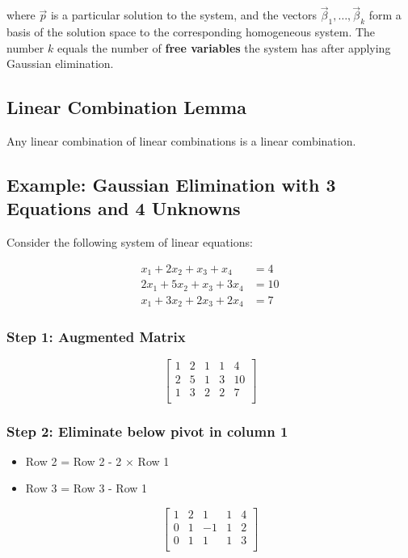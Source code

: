 where \(\vec{p}\) is a particular solution to the system, and the vectors \(\vec{\beta}_1, \ldots, \vec{\beta}_k\) form a basis of the solution space to the corresponding homogeneous system. The number \(k\) equals the number of \textbf{free variables} the system has after applying Gaussian elimination.

\subsection{Linear Combination Lemma}
Any linear combination of linear combinations is a linear combination.

\subsection{Example: Gaussian Elimination with 3 Equations and 4 Unknowns}

Consider the following system of linear equations:

\begin{align*}
	x_1 + 2x_2 + x_3 + x_4   & = 4  \\
	2x_1 + 5x_2 + x_3 + 3x_4 & = 10 \\
	x_1 + 3x_2 + 2x_3 + 2x_4 & = 7
\end{align*}

\subsubsection*{Step 1: Augmented Matrix}

\[
	\begin{bmatrix}
		1 & 2 & 1 & 1 & 4  \\
		2 & 5 & 1 & 3 & 10 \\
		1 & 3 & 2 & 2 & 7  \\
	\end{bmatrix}
\]

\subsubsection*{Step 2: Eliminate below pivot in column 1}

\begin{itemize}[label=\(-\)]
	\item Row 2 = Row 2 - 2 \(\times\) Row 1
	\item Row 3 = Row 3 - Row 1
\end{itemize}

\[
	\begin{bmatrix}
		1 & 2 & 1  & 1 & 4 \\
		0 & 1 & -1 & 1 & 2 \\
		0 & 1 & 1  & 1 & 3 \\
	\end{bmatrix}
\]

